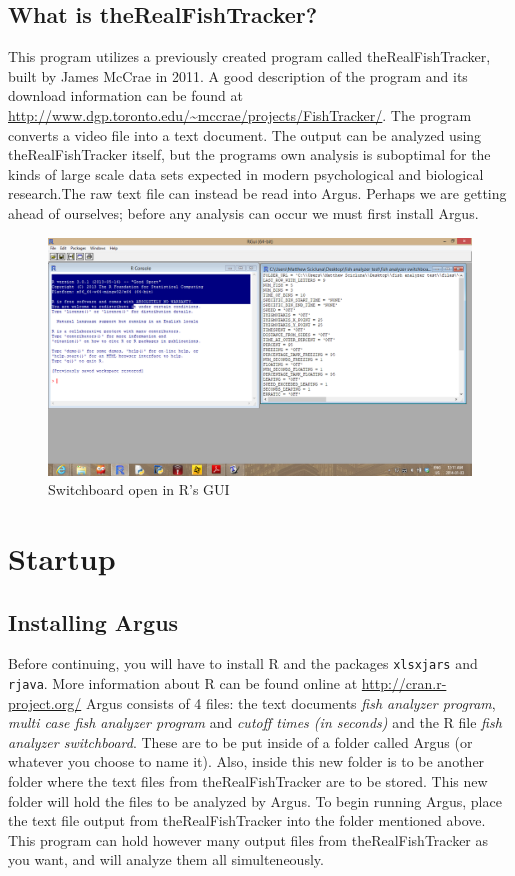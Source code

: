 \documentclass[12pt,titlepage]{report}
\begin{document}
\section{What is theRealFishTracker?}
This program utilizes a previously created program called theRealFishTracker, built by James McCrae in 2011. A good description of the program and its download information can be found at \url{http://www.dgp.toronto.edu/~mccrae/projects/FishTracker/}. The program converts a video file into a text document. The output can be analyzed using theRealFishTracker itself, but the programs own analysis is suboptimal for the kinds of large scale data sets expected in modern psychological and biological research.The raw text file can instead be read into Argus. Perhaps we are getting ahead of ourselves; before any analysis can occur we must first install Argus.
\begin{figure}[ht!]
\centering
\includegraphics[width=120mm]{image1.png}
\caption{Switchboard open in R's GUI}
\label{overflow}
\end{figure}


\chapter{Startup}
\section{Installing Argus}
Before continuing, you will have to install R and the packages \texttt{xlsxjars} and \texttt{rjava}. More information about R can be found online at \url{http://cran.r-project.org/}
 Argus consists of 4 files: the text documents \emph{fish analyzer program}, \emph{multi case fish analyzer program} and \emph{cutoff times (in seconds)} and the R file \emph{fish analyzer switchboard}. These are to be put inside of a folder called Argus (or whatever you choose to name it). Also, inside this new folder is to be another folder where the text files from theRealFishTracker are to be stored. This new folder will hold the files to be analyzed by Argus.
To begin running Argus, place the text file output from theRealFishTracker into the folder mentioned above. This program can hold however many output files from theRealFishTracker as you want, and will analyze them all simulteneously. \\
\end{document}
